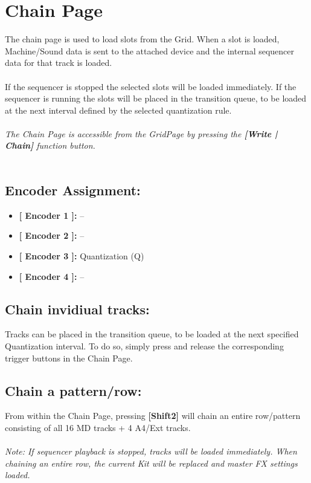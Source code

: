 \chapter{Chain Page}
The chain page is used to load slots from the Grid. When a slot is loaded, Machine/Sound data is sent to the attached device and the internal sequencer data for that track is loaded.\\
\\
If the sequencer is stopped the selected slots will be loaded immediately. If the sequencer is running the slots will be placed in the transition queue, to be loaded at the next interval defined by the selected quantization rule.\\
\\
\textit{The Chain Page is accessible from the GridPage by pressing the  \textbf{[Write | Chain]} function button.}
\\\\
\section{Encoder Assignment:}

\begin{itemize}
	\item \textbf{[ Encoder 1 ]: } --
	\item \textbf{[ Encoder 2 ]: } --
	\item \textbf{[ Encoder 3 ]: } Quantization (Q)
	\item \textbf{[ Encoder 4 ]: }--
\end{itemize}
\section{Chain invidiual tracks:}
Tracks can be placed in the transition queue, to be loaded at the next specified Quantization interval. To do so, simply press and release the corresponding trigger buttons in the Chain Page.
\section{Chain a pattern/row:}
From within the Chain Page, pressing \textbf{[Shift2]} will chain an entire row/pattern consisting of all 16 MD tracks + 4 A4/Ext tracks.\\
\\
\textit{Note: If sequencer playback is stopped, tracks will be loaded immediately. When chaining an entire row, the current Kit will be replaced and master FX settings loaded.}
\newpage
